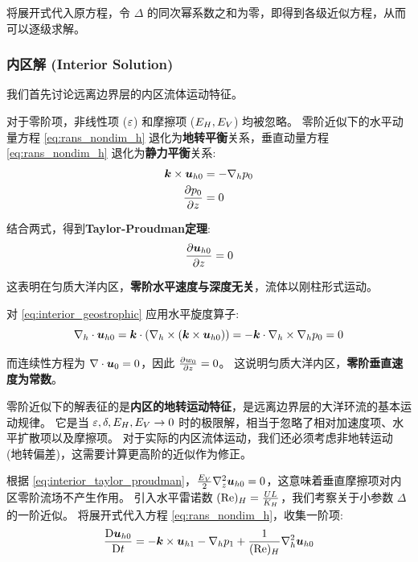 将展开式代入原方程，令 $\Delta$ 的同次幂系数之和为零，即得到各级近似方程，从而可以逐级求解。

\subsubsection{内区解 (Interior Solution)}

我们首先讨论远离边界层的内区流体运动特征。

对于零阶项，非线性项 ($\varepsilon$) 和摩擦项 ($E_H, E_V$) 均被忽略。
零阶近似下的水平动量方程 \eqref{eq:rans_nondim_h} 退化为\textbf{地转平衡}关系，垂直动量方程 \eqref{eq:rans_nondim_h} 退化为\textbf{静力平衡}关系:
\begin{align}
    \kvec \times \vel_{h0} &= -\nabla_{h} \pressure_0 \label{eq:interior_geostrophic} \\
    \pde{\pressure_0}{z} &= 0 \label{eq:interior_hydrostatic}
\end{align}

结合两式，得到\textbf{Taylor-Proudman定理}:
\begin{equation}
    \pde{\vel_{h0}}{z} = 0
    \label{eq:interior_taylor_proudman}
\end{equation}

这表明在匀质大洋内区，\textbf{零阶水平速度与深度无关}，流体以刚柱形式运动。

对 \eqref{eq:interior_geostrophic} 应用水平旋度算子:
\begin{equation}
    \nabla_h \cdot \bm{u}_{h0} = \bm{k} \cdot (\nabla_h \times (\bm{k} \times \bm{u}_{h0})) = -\bm{k} \cdot \nabla_h \times \nabla_h p_0 = 0
    \label{eq:interior_continuity}
\end{equation}

而连续性方程为 $\nabla \cdot \bm{u}_0 = 0$，因此 $\pde{w_0}{z} = 0$。
这说明匀质大洋内区，\textbf{零阶垂直速度为常数}。

零阶近似下的解表征的是\textbf{内区的地转运动特征}，是远离边界层的大洋环流的基本运动规律。
它是当 $\varepsilon, \delta, E_H, E_V \to 0$ 时的极限解，相当于忽略了相对加速度项、水平扩散项以及摩擦项。
对于实际的内区流体运动，我们还必须考虑非地转运动 (地转偏差)，这需要计算更高阶的近似作为修正。

根据 \eqref{eq:interior_taylor_proudman}，$\frac{E_V}{2} \nabla_z^2 \bm{u}_{h0} = 0$，这意味着垂直摩擦项对内区零阶流场不产生作用。
引入水平雷诺数 $(\text{Re})_H = \frac{U L}{K_H}$，我们考察关于小参数 $\Delta$ 的一阶近似。
将展开式代入方程 \eqref{eq:rans_nondim_h}，收集一阶项:
\begin{equation*}
    \frac{\mathrm{D} \bm{u}_{h0}}{\mathrm{D} t} = -\bm{k} \times \bm{u}_{h1} - \nabla_h p_1 + \frac{1}{(\text{Re})_H} \nabla_h^2 \bm{u}_{h0}
\end{equation*}

